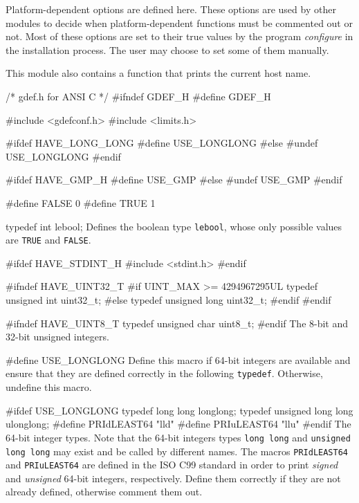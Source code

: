 
Platform-dependent options are defined here.
These options are used by other modules to decide when 
platform-dependent functions must be commented out or not.
Most of these options are set to their true values by the program
{\it configure} in the installation process. The user may choose
to set some of them manually.
\iffalse
Each option must either be left undefined (i.e., the corresponding
macro is put to false, using ``\texttt{\#undef}) 
or can be given its proper value (using ``\texttt{\#define} commands).
An option can be defined only under certain conditions.
For example, \texttt{USE\_GMP} can be defined only if GMP
is available, \texttt{HAVE\_ERF} can be defined only if the Unix \texttt{erf}
function is available, and so on.
\fi
This module also contains a function that prints the current host name.

\code\hide
/* gdef.h  for ANSI C */
#ifndef GDEF_H
#define GDEF_H

#include <gdefconf.h>
#include <limits.h>

#ifdef HAVE_LONG_LONG
#define USE_LONGLONG
#else
#undef USE_LONGLONG
#endif

#ifdef HAVE_GMP_H
#define USE_GMP
#else
#undef USE_GMP
#endif
\endhide
\endcode


\code
#define FALSE 0
#define TRUE 1

typedef int  lebool;
\endcode
  \tab Defines the boolean type \texttt{lebool}, whose only possible values are
  {\tt TRUE} and {\tt FALSE}.
 \endtab
\code


#ifdef HAVE_STDINT_H
#include <stdint.h>
#endif

#ifndef HAVE_UINT32_T
#if UINT_MAX >= 4294967295UL
   typedef unsigned int  uint32_t;
#else
   typedef unsigned long  uint32_t;
#endif
#endif

#ifndef HAVE_UINT8_T
   typedef unsigned char  uint8_t;
#endif
\endcode
  \tab The 8-bit and 32-bit unsigned integers.
 \endtab
\code


#define USE_LONGLONG
\endcode
  \tab  Define this macro if 64-bit integers are available and ensure that
  they are defined correctly in the following \texttt{typedef}. Otherwise,
  undefine this macro.
 \endtab
\code


#ifdef USE_LONGLONG
   typedef long long  longlong;
   typedef unsigned long long  ulonglong;
#define PRIdLEAST64  "lld"
#define PRIuLEAST64  "llu"
#endif
\endcode
  \tab  The 64-bit integer types. Note that the 64-bit integers types
  \texttt{long long} and \texttt{unsigned long long} may exist and be called 
  by different names.
  The macros \texttt{PRIdLEAST64} and \texttt{PRIuLEAST64} are defined 
  in the ISO C99 standard in order to print \emph{signed} 
  and \emph{unsigned}  64-bit integers, respectively.
   Define them correctly if they are not already defined, otherwise 
  comment them out.
 \endtab
\hide
\code


